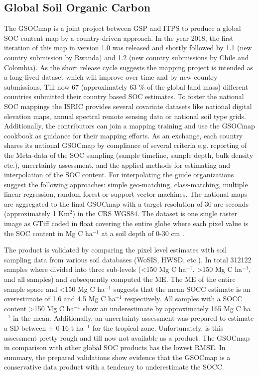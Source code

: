 	\subsection{Global Soil Organic Carbon}
		The \ac{GSOCmap} is a joint project between \ac{GSP} and \ac{ITPS} to produce a global \ac{SOC} content map by a country-driven approach. In the year 2018, the first iteration of this map in version 1.0 was released and shortly followed by 1.1 (new country submission by Rwanda) and 1.2 (new country submissions by Chile and Colombia). As the short release cycle suggests the mapping project is intended as a long-lived dataset which will improve over time and by new country submissions. Till now 67 (approximately 63 \% of the global land mass) different countries submitted their country based \ac{SOC} estimates. To foster the national \ac{SOC} mappings the \ac{ISRIC} provides several covariate datasets like national digital elevation maps, annual spectral remote sensing data or national soil type grids. Additionally, the contributors can join a mapping training and use the \ac{GSOCmap} cookbook as guidance for their mapping efforts. As an exchange, each country shares its national \ac{GSOCmap} by compliance of several criteria e.g. reporting of the Meta-data of the \ac{SOC} sampling (sample timeline, sample depth, bulk density etc.), uncertainty assessment, and the applied methods for estimating and interpolation of the \ac{SOC} content. For interpolating the guide organizations suggest the following approaches: simple geo-matching, class-matching, multiple linear regression, random forest or support vector machines. The national maps are aggregated to the final \ac{GSOCmap} with a target resolution of 30 arc-seconds (approximately 1 Km$^2$) in the \ac{CRS} \ac{WGS84}. The dataset is one single raster image as \ac{GTiff} coded in float covering the entire globe where each pixel value is the \ac{SOC} content in Mg C ha$^{-1}$ at a soil depth of 0-30 cm \citep{FAO2018}.

		The product is validated by comparing the pixel level estimates with soil sampling data from various soil databases (WoSIS, HWSD, etc.). In total 312122 samples where divided into three sub-levels (<150 Mg C ha$^{-1}$, >150 Mg C ha$^{-1}$, and all samples) and subsequently computed the \ac{ME}. The \ac{ME} of the entire sample space and <150 Mg C ha$^{-1}$ suggests that the mean \ac{SOCC} estimate is an overestimate of 1.6 and 4.5 Mg C ha$^{-1}$ respectively. All samples with a \ac{SOCC} content >150 Mg C ha$^{-1}$ show an underestimate by approximately 165 Mg C ha$^{-1}$ in the mean. Additionally, an uncertainty assessment was prepared to estimate a \ac{SD} between $\pm$ 0-16 t ha$^{-1}$ for the tropical zone. Unfortunately, is this assessment pretty rough and till now not available as a product. The \ac{GSOCmap} in comparison with other global \ac{SOC} products has the lowest \ac{RMSE}. In summary, the prepared validations show evidence that the \ac{GSOCmap} is a conservative data product with a tendency to underestimate the \ac{SOCC}.


